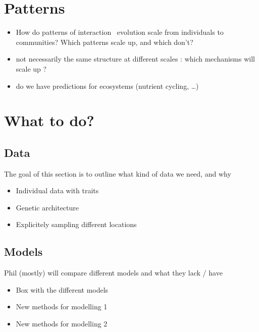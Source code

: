 \documentclass[11pt,oneside]{article}
\begin{document}
\section{Patterns}

\begin{itemize}
    \item How do patterns of interaction \ evolution scale from individuals to
        communities? Which patterns scale up, and which don't?
    \item not necessarily the same structure at different scales : which mechanisms will scale up ?
    \item do we have predictions for ecosystems (nutrient cycling, \ldots)
\end{itemize}


\section{What to do?}

\subsection{Data}

The goal of this section is to outline what kind of data we need, and why

\begin{itemize}
	\item Individual data with traits
	\item Genetic architecture
	\item Explicitely sampling different locations
\end{itemize}

\subsection{Models}

Phil (mostly) will compare different models and what they lack / have 

\begin{itemize}
	\item Box with the different models
	\item New methods for modelling 1
	\item New methods for modelling 2
\end{itemize}
\end{document}
